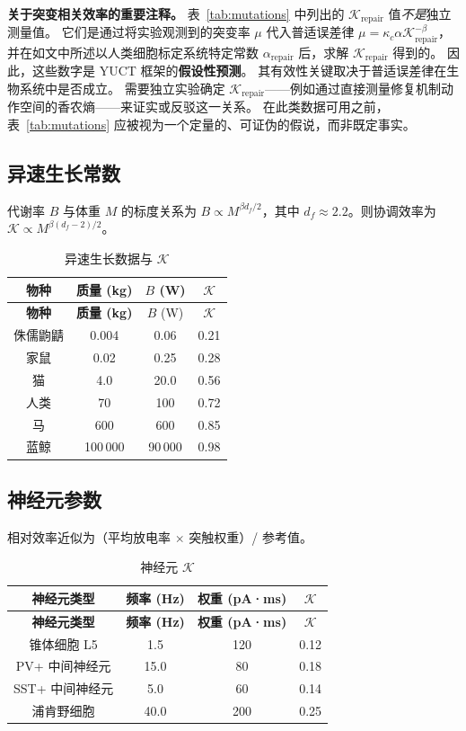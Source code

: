 \documentclass[12pt,a4paper]{article}
\newcommand{\REL}{\mathcal{K}}          %
\begin{document}
	\noindent\textbf{关于突变相关效率的重要注释。}
	表~\ref{tab:mutations} 中列出的 \(\REL_{\mathrm{repair}}\) 值\textit{不是}独立测量值。
	它们是通过将实验观测到的突变率 \(\mu\) 代入普适误差律 \(\mu = \kappa_c \alpha \REL_{\mathrm{repair}}^{-\beta}\)，并在如文中所述以人类细胞标定系统特定常数 \(\alpha_{\mathrm{repair}}\) 后，求解 \(\REL_{\mathrm{repair}}\) 得到的。
	因此，这些数字是 YUCT 框架的\textbf{假设性预测}。
	其有效性关键取决于普适误差律在生物系统中是否成立。
	需要独立实验确定 \(\REL_{\mathrm{repair}}\)——例如通过直接测量修复机制动作空间的香农熵——来证实或反驳这一关系。
	在此类数据可用之前，表~\ref{tab:mutations} 应被视为一个定量的、可证伪的假说，而非既定事实。
	
	\subsection{异速生长常数}
	\label{sec:allometry}
	代谢率 \(B\) 与体重 \(M\) 的标度关系为 \(B\propto M^{\beta d_f/2}\)，其中 \(d_f\approx2.2\)。则协调效率为 \(\REL \propto M^{\beta(d_f-2)/2}\)。
	
	\begin{longtable}{|c|c|c|c|}
		\caption{异速生长数据与 \(\REL\)}\label{tab:allometry}\\
		\hline
		\textbf{物种} & \textbf{质量 (kg)} & \(B\) (W) & \(\REL\) \\
		\hline
		\endfirsthead
		\hline
		\textbf{物种} & \textbf{质量 (kg)} & \(B\) (W) & \(\REL\) \\
		\hline
		\endhead
		\hline
		侏儒鼩鼱 & 0.004 & 0.06 & 0.21 \\
		家鼠 & 0.02 & 0.25 & 0.28 \\
		猫 & 4.0 & 20.0 & 0.56 \\
		人类 & 70 & 100 & 0.72 \\
		马 & 600 & 600 & 0.85 \\
		蓝鲸 & 100\,000 & 90\,000 & 0.98 \\
		\hline
	\end{longtable}
	
	\subsection{神经元参数}
	\label{sec:neural}
	相对效率近似为（平均放电率 \(\times\) 突触权重）/ 参考值。
	
	\begin{longtable}{|c|c|c|c|}
		\caption{神经元 \(\REL\)}\label{tab:neural}\\
		\hline
		\textbf{神经元类型} & \textbf{频率 (Hz)} & \textbf{权重 (pA·ms)} & \(\REL\) \\
		\hline
		\endfirsthead
		\hline
		\textbf{神经元类型} & \textbf{频率 (Hz)} & \textbf{权重 (pA·ms)} & \(\REL\) \\
		\hline
		\endhead
		\hline
		锥体细胞 L5 & 1.5 & 120 & 0.12 \\
		PV+ 中间神经元 & 15.0 & 80 & 0.18 \\
		SST+ 中间神经元 & 5.0 & 60 & 0.14 \\
		浦肯野细胞 & 40.0 & 200 & 0.25 \\
		\hline
	\end{longtable}
	
\end{document}
